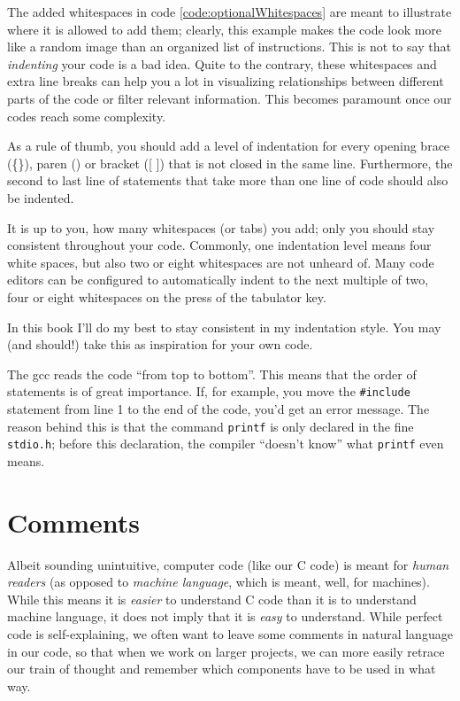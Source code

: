 \begin{hintbox}
The added whitespaces in code \ref{code:optionalWhitespaces} are meant to illustrate where it is allowed to add them; clearly, this example makes the code look more like a random image than an organized list of instructions. This is not to say that \emph{indenting} your code is a bad idea. Quite to the contrary, these whitespaces and extra line breaks can help you a lot in visualizing relationships between different parts of the code or filter relevant information. This becomes paramount once our codes reach some complexity.

As a rule of thumb, you should add a level of indentation for every opening brace (\{\}), paren () or bracket ([ ]) that is not closed in the same line. Furthermore, the second to last line of statements that take more than one line of code should also be indented.

It is up to you, how many whitespaces (or tabs) you add; only you should stay consistent throughout your code. Commonly, one indentation level means four white spaces, but also two or eight whitespaces are not unheard of. Many code editors can be configured to automatically indent to the next multiple of two, four or eight whitespaces on the press of the tabulator key.

In this book I'll do my best to stay consistent in my indentation style. You may (and should!) take this as inspiration for your own code.
\end{hintbox}

The gcc reads the code \enquote{from top to bottom}. This means that the order of statements is of great importance. If, for example, you move the \texttt{\#include} statement from line 1 to the end of the code, you'd get an error message. The reason behind this is that the command \texttt{printf} is only declared in the fine \texttt{stdio.h}; before this declaration, the compiler \enquote{doesn't know} what \texttt{printf} even means.


\section{Comments}
Albeit sounding unintuitive, computer code (like our C code) is meant for \emph{human readers} (as opposed to \emph{machine language}, which is meant, well, for machines). While this means it is \emph{easier} to understand C code than it is to understand machine language, it does not imply that it is \emph{easy} to understand. While perfect code is self-explaining, we often want to leave some comments in natural language in our code, so that when we work on larger projects, we can more easily retrace our train of thought and remember which components have to be used in what way.


